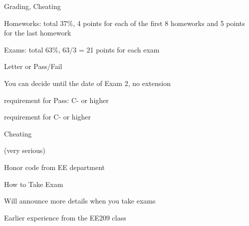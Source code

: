 \begin{frame}{Grading, Cheating}

\plitemsep 0.03in

  \bci 

\item Homeworks: total 37\%, 4 points for each of the first 8 homeworks
  and 5 points for the last homework 

\item Exams: total 63\%, 63/3 = 21 points for each exam 
  \bci
  \item {}
  \eci
\item Letter or Pass/Fail
  \bci
\item You can decide until the date of Exam 2, no extension
\item {} requirement for Pass: C- or higher
\item {} requirement for C- or higher
  \bci
  \item {}
  \eci
  \eci

\item Cheating
  \bci
\item {\bf {}} (very serious)
  \item Honor code from EE department

  \eci
  
  \eci

\end{frame}

\begin{frame}{How to Take Exam}


\plitemsep 0.02in

\bci 

\item Will announce more details when you take exams
  
\item Earlier experience from the EE209 class

  \eci
\vspace{-0.4cm}
\end{frame}



